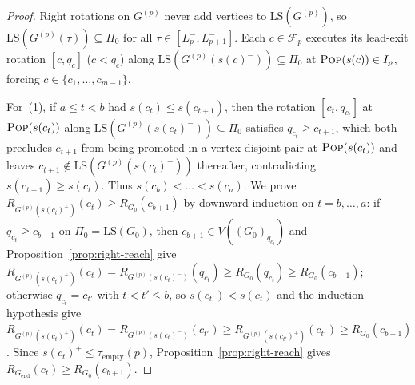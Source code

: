 \documentclass[11pt]{article}
\theoremstyle{definition}
\theoremstyle{remark}
\newcommand{\LS}{\mathrm{LS}}
\newcommand{\POP}{\textnormal{\scshape Pop}}
\begin{document}
\begin{proof}
Right rotations on $G^{(p)}$ never add vertices to $\LS(G^{(p)})$, so $\LS(G^{(p)}(\tau)) \subseteq \Pi_0$ for all $\tau \in [L_p^-, L_{p+1}^-]$. Each $c \in \mathcal{F}_p$ executes its lead-exit rotation $[c, q_c]$ ($c < q_c$) along $\LS(G^{(p)}(s(c)^-)) \subseteq \Pi_0$ at $\POP(s(c)) \in I_p$, forcing $c \in \{c_1, \dots, c_{m-1}\}$.

For~(1), if $a \le t < b$ had $s(c_t) \le s(c_{t+1})$, then the rotation $[c_t, q_{c_t}]$ at $\POP(s(c_t))$ along $\LS(G^{(p)}(s(c_t)^-)) \subseteq \Pi_0$ satisfies $q_{c_t} \ge c_{t+1}$, which both precludes $c_{t+1}$ from being promoted in a vertex-disjoint pair at $\POP(s(c_t))$ and leaves $c_{t+1} \notin \LS(G^{(p)}(s(c_t)^+))$ thereafter, contradicting $s(c_{t+1}) \ge s(c_t)$. Thus $s(c_b) < \dots < s(c_a)$. We prove $R_{G^{(p)}(s(c_t)^+)}(c_t) \ge R_{G_0}(c_{b+1})$ by downward induction on $t = b, \dots, a$: if $q_{c_t} \ge c_{b+1}$ on $\Pi_0 = \LS(G_0)$, then $c_{b+1} \in V((G_0)_{q_{c_t}})$ and Proposition~\ref{prop:right-reach} give $R_{G^{(p)}(s(c_t)^+)}(c_t) = R_{G^{(p)}(s(c_t)^-)}(q_{c_t}) \ge R_{G_0}(q_{c_t}) \ge R_{G_0}(c_{b+1})$; otherwise $q_{c_t} = c_{t'}$ with $t < t' \le b$, so $s(c_{t'}) < s(c_t)$ and the induction hypothesis give $R_{G^{(p)}(s(c_t)^+)}(c_t) = R_{G^{(p)}(s(c_t)^-)}(c_{t'}) \ge R_{G^{(p)}(s(c_{t'})^+)}(c_{t'}) \ge R_{G_0}(c_{b+1})$. Since $s(c_t)^+ \le \tau_{\mathrm{empty}}(p)$, Proposition~\ref{prop:right-reach} gives $R_{G_{\mathrm{end}}}(c_t) \ge R_{G_0}(c_{b+1})$.


\end{proof}
\end{document}
